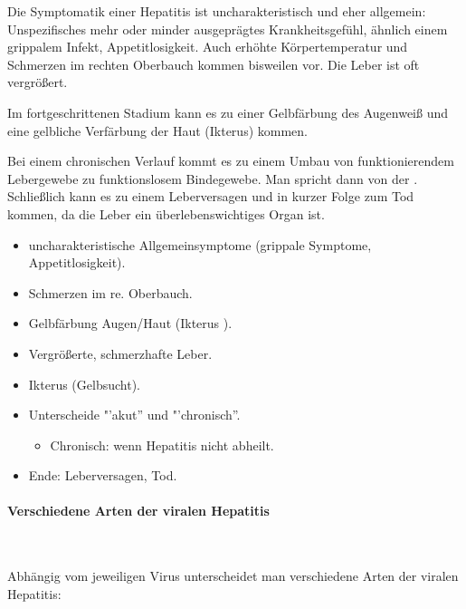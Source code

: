 {
Die Symptomatik einer Hepatitis ist
uncharakteristisch und eher allgemein: Unspezifisches mehr oder minder
ausgeprägtes Krankheitsgefühl, ähnlich einem grippalem Infekt, Appetitlosigkeit.
Auch erhöhte Körpertemperatur und Schmerzen im
rechten Oberbauch kommen bisweilen vor. Die Leber ist oft
vergrößert.

Im
fortgeschrittenen Stadium kann es zu einer Gelbfärbung
des Augenweiß und eine gelbliche Verfärbung der Haut
(Ikterus) kommen. 

Bei einem chronischen
Verlauf kommt es zu einem Umbau von
funktionierendem Lebergewebe zu
funktionslosem Bindegewebe. Man spricht
dann von der
\label{topic:leberzirrhose}.
Schließlich kann es zu einem Leberversagen und in kurzer
Folge zum Tod kommen, da die Leber ein überlebenswichtiges
Organ ist. 
}{
\begin{itemize}
  \item uncharakteristische Allgemeinsymptome (grippale Symptome,
  Appetitlosigkeit).
  \item Schmerzen im re. Oberbauch.
  \item Gelbfärbung Augen/Haut (Ikterus ).
  \item Vergrößerte, schmerzhafte Leber.
  \item Ikterus (Gelbsucht).
  \item Unterscheide "'akut{\textquotedblright} und
  "'chronisch{\textquotedblright}.
  \begin{itemize}
    \item Chronisch: wenn Hepatitis nicht abheilt.
  \end{itemize}
  \item Ende: Leberversagen, Tod.
\end{itemize}
}{}{}{}



\paragraph{Verschiedene Arten der viralen Hepatitis}~

Abhängig vom jeweiligen Virus unterscheidet man
verschiedene Arten der viralen Hepatitis:

